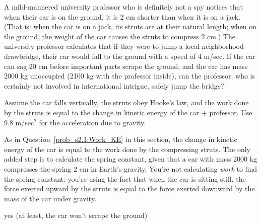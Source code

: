 \begin{Mquestion}\label{prob_s2.1:Work_KE2}
A mild-mannered university professor who is definitely not a spy notices that when their car is on the ground, it is 2 cm shorter than when it is on a jack. (That is: when the car is on a jack, its struts are at their natural length; when on the ground, the weight of the car causes the struts to compress 2 cm.) The university professor calculates that if they were to jump a local neighborhood drawbridge, their car would fall to the ground with a speed of 4 m/sec. If the car can sag 20 cm before important parts scrape the ground, and the car has mass 2000 kg unoccupied (2100 kg with the professor inside), can the professor, who is certainly not involved in international intrigue, safely jump the  bridge?

Assume the car falls vertically, the struts obey Hooke's law, and the work done by the struts is equal to the change in kinetic energy of the car + professor. Use 9.8 m/sec$^2$ for  the acceleration due to gravity.
\end{Mquestion}
\begin{hint}
As in Question~\ref{prob_s2.1:Work_KE} in this section, the change in kinetic energy of the car is equal to the work done by the compressing struts. The only added step is to calculate the spring constant, given that a car with mass 2000 kg compresses the spring 2 cm in Earth's gravity. You're not calculating \emph{work} to find the spring constant: you're using the fact that when the car is sitting still, the force exerted upward by the struts is equal to the force exerted downward by the mass of the car under gravity.
\end{hint}
\begin{answer}
yes (at least, the car won't scrape the ground)
\end{answer}
